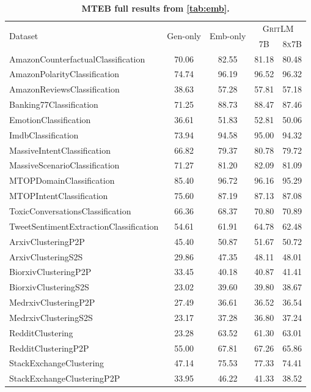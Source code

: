 \documentclass{article}
\newcommand{\model}{\textsc{GritLM}}
\begin{document}
\begin{longtable}{l|cccc}
\caption{\textbf{MTEB full results from \autoref{tab:emb}.}} \\
\toprule
\multirow{2}{*}{Dataset} & \multirow{2}{*}{Gen-only} & \multirow{2}{*}{Emb-only} & \multicolumn{2}{c}{\model{}} \\
& & & \textsc{7B} & \textsc{8x7B} \\
\midrule
AmazonCounterfactualClassification & 70.06 & 82.55 & 81.18 & 80.48 \\
AmazonPolarityClassification & 74.74 & 96.19 & 96.52 & 96.32 \\
AmazonReviewsClassification & 38.63 & 57.28 & 57.81 & 57.18 \\
Banking77Classification & 71.25 & 88.73 & 88.47 & 87.46 \\
EmotionClassification & 36.61 & 51.83 & 52.81 & 50.06 \\
ImdbClassification & 73.94 & 94.58 & 95.00 & 94.32 \\
MassiveIntentClassification & 66.82 & 79.37 & 80.78 & 79.72 \\
MassiveScenarioClassification & 71.27 & 81.20 & 82.09 & 81.09 \\
MTOPDomainClassification & 85.40 & 96.72 & 96.16 & 95.29 \\
MTOPIntentClassification & 75.60 & 87.19 & 87.13 & 87.08 \\
ToxicConversationsClassification & 66.36 & 68.37 & 70.80 & 70.89 \\
TweetSentimentExtractionClassification & 54.61 & 61.91 & 64.78 & 62.48 \\
\midrule
ArxivClusteringP2P & 45.40 & 50.87 & 51.67 & 50.72 \\
ArxivClusteringS2S & 29.86 & 47.35 & 48.11 & 48.01 \\
BiorxivClusteringP2P & 33.45 & 40.18 & 40.87 & 41.41 \\
BiorxivClusteringS2S & 23.02 & 39.60 & 39.80 & 38.67 \\
MedrxivClusteringP2P & 27.49 & 36.61 & 36.52 & 36.54 \\
MedrxivClusteringS2S & 23.17 & 37.28 & 36.80 & 37.24 \\
RedditClustering & 23.28 & 63.52 & 61.30 & 63.01 \\
RedditClusteringP2P & 55.00 & 67.81 & 67.26 & 65.86 \\
StackExchangeClustering & 47.14 & 75.53 & 77.33 & 74.41 \\
StackExchangeClusteringP2P & 33.95 & 46.22 & 41.33 & 38.52 \\

\end{longtable}
\end{document}
